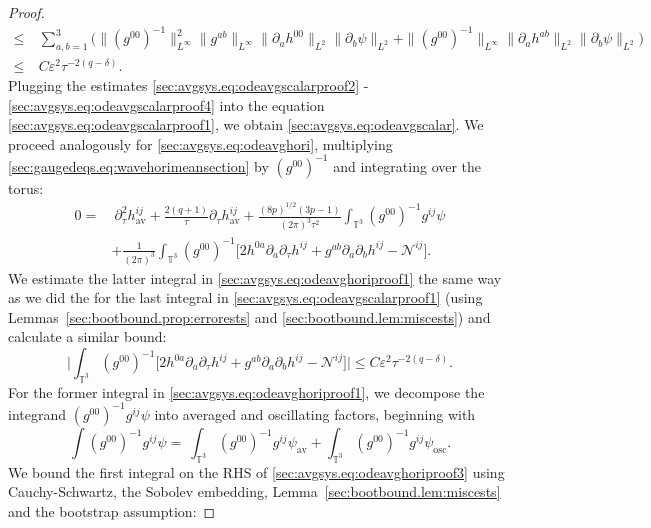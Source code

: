 \documentclass{article}
\newcommand{\TT}{\mathbb{T}}
\newcommand{\osc}{\mathrm{osc}}
\newcommand{\av}{\mathrm{av}}
\newcommand{\mc}{\mathcal}
\newcommand{\ve}{\varepsilon}
\newcommand{\pa}{\partial}
\begin{document}
\begin{proof}
\begin{subequations}
\begin{align}
            \leq&\>\sum_{a,b=1}^3\big(\|(g^{00})^{-1}\|_{L^\infty}^2\|g^{ab}\|_{L^\infty}\|\pa_a h^{00}\|_{L^2}\|\pa_b \psi\|_{L^2}+\|(g^{00})^{-1}\|_{L^\infty} \|\pa_a h^{ab}\|_{L^2}\|\pa_b \psi\|_{L^2}\big)\nonumber\\ 
        \leq&\> C\ve^2 \tau^{-2(q-\delta)}.\label{sec:avgsys.eq:odeavgscalarproof4}
        \end{align}
    \end{subequations}
    Plugging the estimates  \eqref{sec:avgsys.eq:odeavgscalarproof2} - \eqref{sec:avgsys.eq:odeavgscalarproof4} into the equation \eqref{sec:avgsys.eq:odeavgscalarproof1}, we obtain \eqref{sec:avgsys.eq:odeavgscalar}. We proceed analogously for \eqref{sec:avgsys.eq:odeavghori}, multiplying \eqref{sec:gaugedeqs.eq:wavehorimeansection} by $(g^{00})^{-1}$ and integrating over the torus:
    \begin{align}
        0 = &\>\pa_\tau^2 h_{\av}^{ij} + \frac{2(q+1)}{\tau}\pa_\tau h_{\av}^{ij} + \frac{(8p)^{1/2}(3p-1)}{(2\pi)^3\tau^2}\int_{\TT^3}(g^{00})^{-1}g^{ij}\psi\nonumber\\
        &+\frac{1}{(2\pi)^3}\int_{\TT^3}(g^{00})^{-1}\Big[2h^{0a}\pa_a\pa_\tau h^{ij} + g^{ab}\pa_a\pa_b h^{ij} - \mc{N}^{ij}\Big].\label{sec:avgsys.eq:odeavghoriproof1}
    \end{align}
    We estimate the latter integral in \eqref{sec:avgsys.eq:odeavghoriproof1} the same way as we did the for the last integral in \eqref{sec:avgsys.eq:odeavgscalarproof1} (using Lemmas~\ref{sec:bootbound.prop:errorests} and \ref{sec:bootbound.lem:miscests}) and calculate a similar bound:
    \begin{equation}\label{sec:avgsys.eq:odeavghoriproof2}
        \Big|\int_{\TT^3}(g^{00})^{-1}\Big[2h^{0a}\pa_a\pa_\tau h^{ij} + g^{ab}\pa_a\pa_b h^{ij} - \mc{N}^{ij}\Big]\Big| \leq C\ve^2 \tau^{-2(q-\delta)}.
    \end{equation}
    For the former integral in \eqref{sec:avgsys.eq:odeavghoriproof1}, we decompose the integrand $(g^{00})^{-1}g^{ij}\psi$ into averaged and oscillating factors, beginning with
    \begin{equation}\label{sec:avgsys.eq:odeavghoriproof3}
        \int(g^{00})^{-1}g^{ij}\psi =\> \int_{\TT^3}(g^{00})^{-1}g^{ij} \psi_{\av}+ \int_{\TT^3}(g^{00})^{-1} g^{ij}\psi_{\osc}.
    \end{equation}
    We bound the first integral on the RHS of \eqref{sec:avgsys.eq:odeavghoriproof3} using Cauchy-Schwartz, the Sobolev embedding, Lemma~\ref{sec:bootbound.lem:miscests} and the bootstrap assumption:

\end{proof}
\end{document}
